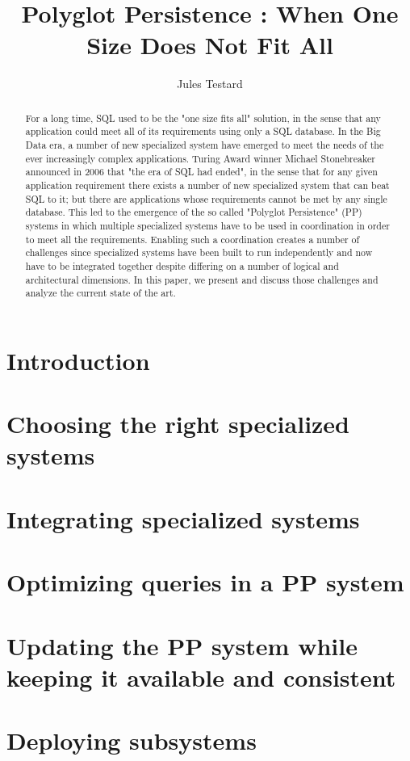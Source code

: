 \documentclass[11pt]{article}
\begin{document}
\title{Polyglot Persistence : When One Size Does Not Fit All}
\author{Jules Testard}
\maketitle

\begin{abstract}
For a long time, SQL used to be the "one size fits all" solution, in the sense that any application could meet all of its requirements using only a SQL database. In the Big Data era, a number of new specialized system have emerged to meet the needs of the ever increasingly complex applications. Turing Award winner Michael Stonebreaker announced in 2006 that "the era of SQL had ended", in the sense that for any given application requirement there exists a number of new specialized system that can beat SQL to it; but there are applications whose requirements cannot be met by any single database. This led to the emergence of the so called "Polyglot Persistence" (PP) systems in which multiple specialized systems have to be used in coordination in order to meet all the requirements. Enabling such a coordination creates a number of challenges since specialized systems have been built to run independently and now have to be integrated together despite differing on a number of logical and architectural dimensions. In this paper, we present and discuss those challenges and analyze the current state of the art.
\end{abstract}

\section{Introduction}



\section{Choosing the right specialized systems}



\section{Integrating specialized systems}



\section{Optimizing queries in a PP system}



\section{Updating the PP system while keeping it available and consistent}



\section{Deploying subsystems}




{}

\end{document}
